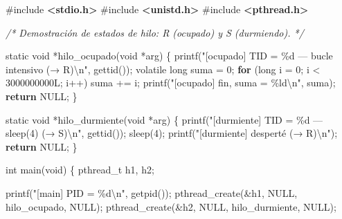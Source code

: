 \documentclass[
  spanish,
]{article}
\newenvironment{Shaded}{}{}
\newcommand{\BuiltInTok}[1]{\textcolor[rgb]{0.00,0.50,0.00}{#1}}
\newcommand{\CommentTok}[1]{\textcolor[rgb]{0.38,0.63,0.69}{\textit{#1}}}
\newcommand{\ControlFlowTok}[1]{\textcolor[rgb]{0.00,0.44,0.13}{\textbf{#1}}}
\newcommand{\DataTypeTok}[1]{\textcolor[rgb]{0.56,0.13,0.00}{#1}}
\newcommand{\DecValTok}[1]{\textcolor[rgb]{0.25,0.63,0.44}{#1}}
\newcommand{\ImportTok}[1]{\textcolor[rgb]{0.00,0.50,0.00}{\textbf{#1}}}
\newcommand{\NormalTok}[1]{#1}
\newcommand{\OperatorTok}[1]{\textcolor[rgb]{0.40,0.40,0.40}{#1}}
\newcommand{\PreprocessorTok}[1]{\textcolor[rgb]{0.74,0.48,0.00}{#1}}
\newcommand{\SpecialCharTok}[1]{\textcolor[rgb]{0.25,0.44,0.63}{#1}}
\newcommand{\StringTok}[1]{\textcolor[rgb]{0.25,0.44,0.63}{#1}}
\begin{document}
\begin{Shaded}
\begin{Highlighting}[]
\PreprocessorTok{\#include }\ImportTok{\textless{}stdio.h\textgreater{}}
\PreprocessorTok{\#include }\ImportTok{\textless{}unistd.h\textgreater{}}
\PreprocessorTok{\#include }\ImportTok{\textless{}pthread.h\textgreater{}}

\CommentTok{/* Demostración de estados de hilo: R (ocupado) y S (durmiendo). */}

\DataTypeTok{static} \DataTypeTok{void} \OperatorTok{*}\NormalTok{hilo\_ocupado}\OperatorTok{(}\DataTypeTok{void} \OperatorTok{*}\NormalTok{arg}\OperatorTok{)} \OperatorTok{\{}
\NormalTok{    printf}\OperatorTok{(}\StringTok{"[ocupado]  TID = }\SpecialCharTok{\%d}\StringTok{ — bucle intensivo (→ R)}\SpecialCharTok{\textbackslash{}n}\StringTok{"}\OperatorTok{,}\NormalTok{ gettid}\OperatorTok{());}
    \DataTypeTok{volatile} \DataTypeTok{long}\NormalTok{ suma }\OperatorTok{=} \DecValTok{0}\OperatorTok{;}
    \ControlFlowTok{for} \OperatorTok{(}\DataTypeTok{long}\NormalTok{ i }\OperatorTok{=} \DecValTok{0}\OperatorTok{;}\NormalTok{ i }\OperatorTok{\textless{}} \DecValTok{3000000000}\BuiltInTok{L}\OperatorTok{;}\NormalTok{ i}\OperatorTok{++)}
\NormalTok{        suma }\OperatorTok{+=}\NormalTok{ i}\OperatorTok{;}
\NormalTok{    printf}\OperatorTok{(}\StringTok{"[ocupado]  fin, suma = }\SpecialCharTok{\%ld\textbackslash{}n}\StringTok{"}\OperatorTok{,}\NormalTok{ suma}\OperatorTok{);}
    \ControlFlowTok{return}\NormalTok{ NULL}\OperatorTok{;}
\OperatorTok{\}}

\DataTypeTok{static} \DataTypeTok{void} \OperatorTok{*}\NormalTok{hilo\_durmiente}\OperatorTok{(}\DataTypeTok{void} \OperatorTok{*}\NormalTok{arg}\OperatorTok{)} \OperatorTok{\{}
\NormalTok{    printf}\OperatorTok{(}\StringTok{"[durmiente] TID = }\SpecialCharTok{\%d}\StringTok{ — sleep(4) (→ S)}\SpecialCharTok{\textbackslash{}n}\StringTok{"}\OperatorTok{,}\NormalTok{ gettid}\OperatorTok{());}
\NormalTok{    sleep}\OperatorTok{(}\DecValTok{4}\OperatorTok{);}
\NormalTok{    printf}\OperatorTok{(}\StringTok{"[durmiente] desperté (→ R)}\SpecialCharTok{\textbackslash{}n}\StringTok{"}\OperatorTok{);}
    \ControlFlowTok{return}\NormalTok{ NULL}\OperatorTok{;}
\OperatorTok{\}}

\DataTypeTok{int}\NormalTok{ main}\OperatorTok{(}\DataTypeTok{void}\OperatorTok{)} \OperatorTok{\{}
\NormalTok{    pthread\_t h1}\OperatorTok{,}\NormalTok{ h2}\OperatorTok{;}

\NormalTok{    printf}\OperatorTok{(}\StringTok{"[main] PID = }\SpecialCharTok{\%d\textbackslash{}n}\StringTok{"}\OperatorTok{,}\NormalTok{ getpid}\OperatorTok{());}
\NormalTok{    pthread\_create}\OperatorTok{(\&}\NormalTok{h1}\OperatorTok{,}\NormalTok{ NULL}\OperatorTok{,}\NormalTok{ hilo\_ocupado}\OperatorTok{,}\NormalTok{ NULL}\OperatorTok{);}
\NormalTok{    pthread\_create}\OperatorTok{(\&}\NormalTok{h2}\OperatorTok{,}\NormalTok{ NULL}\OperatorTok{,}\NormalTok{ hilo\_durmiente}\OperatorTok{,}\NormalTok{ NULL}\OperatorTok{);}


\end{Highlighting}
\end{Shaded}
\end{document}
